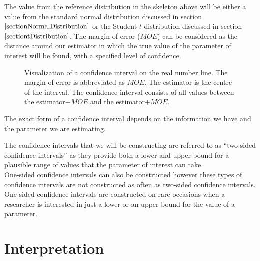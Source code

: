\noindent
The value from the reference distribution in the skeleton above 
will be either a value from the standard normal distribution discussed in section $\ref{sectionNormalDistribution}$
or the Student $t$-distribution discussed in section $\ref{sectiontDistribution}$. The margin of error ($MOE$) can be considered as the distance around our estimator in which the true value of the parameter of interest will be found, with a specified level of confidence.

\begin{figure}[H]
\label{figureVisualization of CI}
\begin{center}
\end{center}
\vspace{-0.60cm}
\caption{Visualization of a confidence interval on the real number line. The margin of error is abbreviated as $MOE$. The estimator is the centre of the interval. The confidence interval consists of all values between the estimator$- MOE$ and the estimator$+ MOE$.}
\end{figure}

The exact form of a confidence interval depends on the information we have and the parameter we are estimating.

\begin{nt}\label{noteOneSidedTwoSidedCIs}
The confidence intervals that we will be constructing are referred to as ``two-sided confidence intervals'' as they provide both a lower and upper bound for a plausible range of values that the parameter of interest can take.\\

One-sided confidence intervals can also be constructed however these types of confidence intervals are not constructed as often as two-sided confidence intervals. One-sided confidence intervals are constructed on rare occasions when a researcher is interested in just a lower or an upper bound for the value of a parameter.
\end{nt}


\section{Interpretation}


